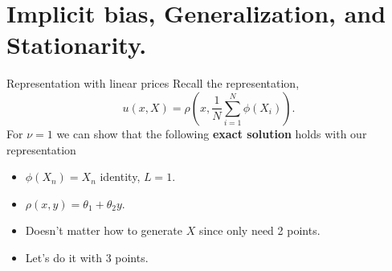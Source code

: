 \documentclass[aspectratio=169,10pt]{beamer}
\newcommand{\emphcolor}[1]{\textbf{\textcolor{emphcolorval}{#1}}}
\newcommand{\expec}[2][]{\ensuremath{\mathbb{E}_{{#1}}\left[ {#2} \right]}}
\begin{document}
\section{Implicit bias, Generalization, and Stationarity.}

\begin{frame}{Representation with  linear prices}
	Recall the representation,
	\begin{equation*}
		u(x, X) =\rho \left( x, \frac{1}{N}\sum_{i=1}^{N} \phi(X_i) \right).
	\end{equation*}
	For $\nu =1$ we can show that the following \emphcolor{exact solution} holds with our representation
	\begin{itemize}
		\item $\phi(X_n) = X_n$  identity, $L=1$. \vspace{0.1in}
		\item $\rho(x, y) = \theta_1 + \theta_2 y$. \vspace{0.1in}
		\item Doesn't matter how to generate $X$ since only need 2 points. \vspace{0.1in}
		\item Let's do it with $3$ points.
	\end{itemize}

\end{frame}
\end{document}
